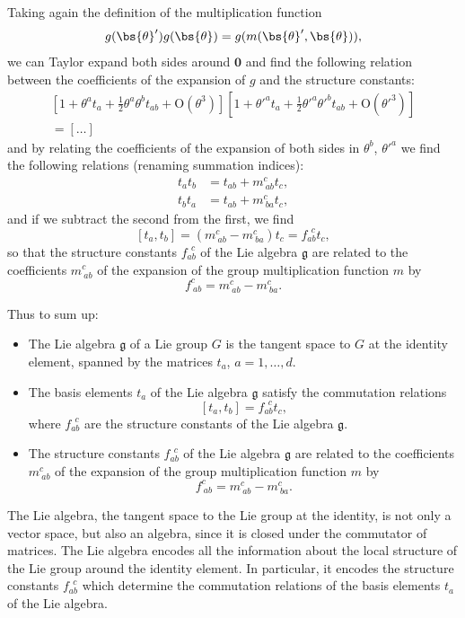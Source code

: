 Taking again the definition of the multiplication function
\[
    g(\bs{\theta}') g(\bs{\theta}) = g(m(\bs{\theta}', \bs{\theta})),
\]
we can Taylor expand both sides around \(\mathbf{0}\) and find the following relation between the coefficients of the expansion of \(g\) and the structure constants:
\[
    \begin{aligned}
        \left[ 1 + \theta^a t_a + \frac{1}{2} \theta^a \theta^b t_{ab} + \mathrm{O}(\theta^3) \right] \left[ 1 + \theta'^a t_a + \frac{1}{2} \theta'^a \theta'^b t_{ab} + \mathrm{O}(\theta'^3) \right] \\
        =[\dots ]
    \end{aligned}
\]
and by relating the coefficients of the expansion of both sides in \(\theta^b\), \(\theta'^a\) we find the following relations (renaming summation indices):
\[
    \begin{aligned}
        t_a t_b & = t_{ab} + m^c_{\ ab} t_c, \\
        t_b t_a & = t_{ab} + m^c_{\ ba} t_c,
    \end{aligned}
\]
and if we subtract the second from the first, we find
\[
    [t_a, t_b] = (m^c_{\ ab} - m^c_{\ ba}) t_c = f_{ab}^{\ \ c} t_c,
\]
so that the structure constants \(f_{ab}^{\ \ c}\) of the Lie algebra \(\mathfrak{g}\) are related to the coefficients \(m^c_{\ ab}\) of the expansion of the group multiplication function \(m\) by
\[
    f_{\ ab}^{c} = m^c_{\ ab} - m^c_{\ ba}.
\]

Thus to sum up:
\begin{itemize}
    \item The Lie algebra \(\mathfrak{g}\) of a Lie group \(G\) is the tangent space to \(G\) at the identity element, spanned by the matrices \(t_a\), \(a = 1, \ldots, d\).
    \item The basis elements \(t_a\) of the Lie algebra \(\mathfrak{g}\) satisfy the commutation relations
          \[
              [t_a, t_b] = f_{ab}^{\ \ c} t_c,
          \]
          where \(f_{ab}^{\ \ c}\) are the structure constants of the Lie algebra \(\mathfrak{g}\).
    \item The structure constants \(f_{ab}^{\ \ c}\) of the Lie algebra \(\mathfrak{g}\) are related to the coefficients \(m^c_{\ ab}\) of the expansion of the group multiplication function \(m\) by
          \[
              f_{\ ab}^{c} = m^c_{\ ab} - m^c_{\ ba}.
          \]
\end{itemize}

The Lie algebra, the tangent space to the Lie group at the identity, is not only a vector space, but also an algebra, since it is closed under the commutator of matrices. The Lie algebra encodes all the information about the local structure of the Lie group around the identity element. In particular, it encodes the structure constants \(f_{ab}^{\ \ c}\) which determine the commutation relations of the basis elements \(t_a\) of the Lie algebra.

